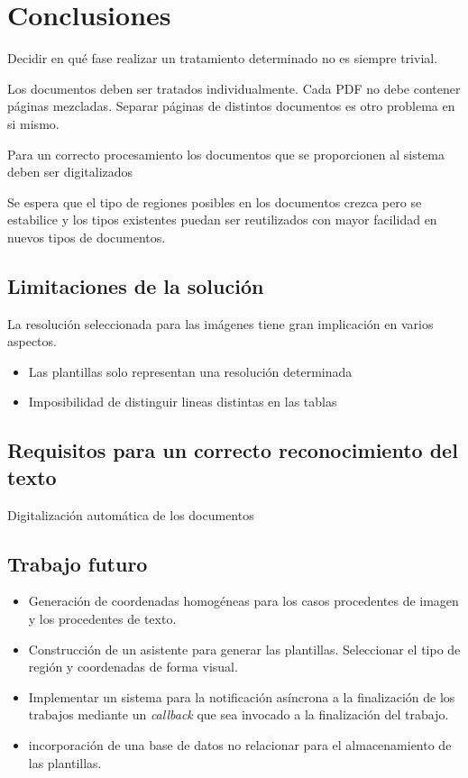 
\chapter{Conclusiones}
\label{chap:conclusiones}

Decidir en qué fase realizar un tratamiento determinado no es siempre trivial.

Los documentos deben ser tratados individualmente. Cada PDF no debe contener páginas mezcladas. Separar páginas de distintos documentos es otro problema en si mismo.

Para un correcto procesamiento los documentos que se proporcionen 
al sistema deben ser digitalizados 

Se espera que el tipo de regiones posibles en los documentos crezca pero se estabilice y los tipos existentes puedan ser reutilizados con mayor facilidad en nuevos tipos de documentos.

\section{Limitaciones de la solución}
La resolución seleccionada para las imágenes tiene gran implicación en varios aspectos.
\begin{itemize}
    \item Las plantillas solo representan una resolución determinada
    \item Imposibilidad de distinguir lineas distintas en las tablas
\end{itemize}

\section{Requisitos para un correcto reconocimiento del texto}
Digitalización automática de los documentos


\section{Trabajo futuro}

\begin{itemize}
    \item Generación de coordenadas homogéneas para los casos procedentes de imagen y los procedentes de texto.
    \item Construcción de un asistente para generar las plantillas. Seleccionar el tipo de región y coordenadas de forma visual.
    \item Implementar un sistema para la notificación asíncrona a la finalización de los trabajos mediante un \emph{callback} que sea invocado a la finalización del trabajo.
    \item incorporación de una base de datos no relacionar para el almacenamiento de las plantillas.
\end{itemize}

